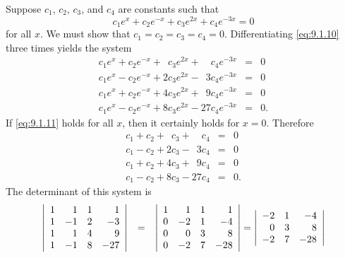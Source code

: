 \begin{examplesolution}
\solution Suppose $c_{1}$, $c_{2}$, $c_{3}$, and $c_{4}$ are constants such that
\begin{equation}
  \label{eq:9.1.10}c_{1}e^{x}+c_{2}e^{-x}+c_{3}e^{2x}+c_{4}e^{-3x}=0
\end{equation}
for all $x$. We must show that $c_{1}=c_{2}=c_{3}=c_{4}=0$. Differentiating \eqref{eq:9.1.10} three
times yields the system
\begin{equation}
  \label{eq:9.1.11}
  \begin{array}{rcl}
    c_{1}e^{x}+c_{2}e^{-x}+\phantom{2}c_{3}e^{2x}+\phantom{27}c_{4}e^{-3x} & = & 0  \\
    c_{1}e^{x}-c_{2}e^{-x}+2c_{3}e^{2x}-\phantom{2}3c_{4}e^{-3x}           & = & 0  \\
    c_{1}e^{x}+c_{2}e^{-x}+4c_{3}e^{2x}+\phantom{2}9c_{4}e^{-3x}           & = & 0  \\
    c_{1}e^{x}-c_{2}e^{-x}+8c_{3}e^{2x}-27c_{4}e^{-3x}                     & = & 0.
  \end{array}
\end{equation}
If \eqref{eq:9.1.11} holds for all $x$, then it certainly holds for $x=0$. Therefore
\[
  \begin{array}{rcl}
    c_{1}+c_{2}+\phantom{2}c_{3}+\phantom{27}c_{4} & = & 0  \\
    c_{1}-c_{2}+2c_{3}-\phantom{2}3c_{4}           & = & 0  \\
    c_{1}+c_{2}+4c_{3}+\phantom{2}9c_{4}           & = & 0  \\
    c_{1}-c_{2}+8c_{3}-27c_{4}                     & = & 0.
  \end{array}
\]
The determinant of this system is
\begin{equation}
  \label{eq:9.1.12}
  \begin{array}{rcl}
    \left|\begin{array}{rrrr}1&1&1&1\\1&-1&2&-3\\1&1&4&9\\ 1&-1&8&-27\end{array}\right| & = & \left|\begin{array}{rrrr}1&1&1&1\\0&-2&1&-4\\0&0&3&8\\ 0&-2&7&-28\end{array}\right| =\left|\begin{array}{rrr}-2&1&-4\\0&3&8\\ -2&7&-28\end{array}\right| \\[8\jot]

\end{array}
\end{equation}
\end{examplesolution}
